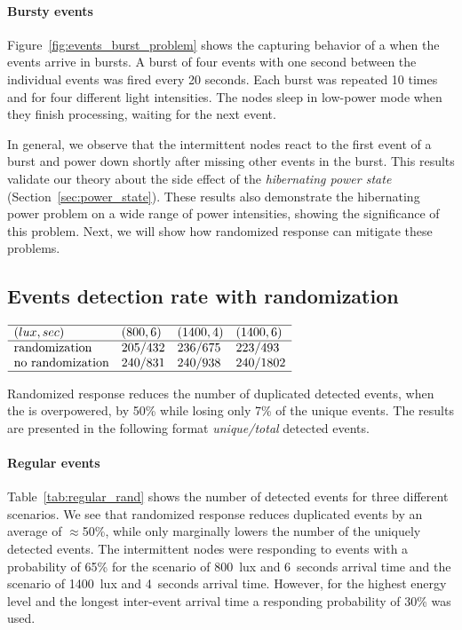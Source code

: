 \paragraph{Bursty events}
Figure~\ref{fig:events_burst_problem} shows the capturing behavior of a \sys when the events arrive in bursts. A burst of four events with one second between the individual events was fired every 20 seconds. Each burst was repeated 10 times and for four different light intensities. The nodes sleep in low-power mode when they finish processing, waiting for the next event. 

In general, we observe that the intermittent nodes react to the first event of a burst and power down shortly after missing other events in the burst. This results validate our theory about the side effect of the \textit{hibernating power state} (Section~\ref{sec:power_state}). These results also demonstrate the hibernating power problem on a wide range of power intensities, showing the significance of this problem. Next, we will show how randomized response can mitigate these problems. 

\subsection{Events detection rate with randomization}
\begin{table}
	\centering
    $
    \begin{array}{llll}\hline
     (lux,sec) & (800,6) & (1400,4) &(1400,6)\\\hline
    \text{randomization} &  205/432 & 236/675 & 223/493 \\
    \text{no randomization} & 240/831 &  240/938 & 240/1802 \\\hline
    \end{array}
    $
    \caption{Randomized response reduces the number of duplicated detected events,  when the \sys is overpowered, by 50\% while losing only 7\% of the unique events. The results are presented in the following format \textit{unique/total} detected events.}
    \label{tab:regular_rand}
\end{table}
%
\paragraph{Regular events} Table~\ref{tab:regular_rand} shows the number of detected events for three different scenarios. We see that randomized response reduces duplicated events by an average of $\approx$50\%, while only marginally lowers the number of the uniquely detected events. The intermittent nodes were responding to events with a probability of 65\% for the scenario of \SI{800}{lux} and \SI{6}{seconds} arrival time and the scenario of \SI{1400}{lux} and \SI{4}{seconds} arrival time. However, for the highest energy level and the longest inter-event arrival time a responding probability of 30\% was used.


